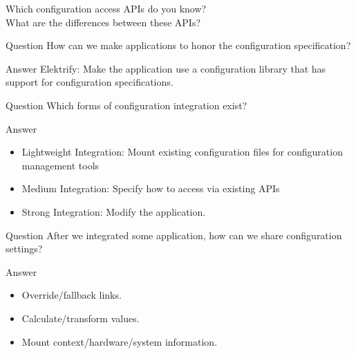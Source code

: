 \begin{frame}
	\begin{task}
	Which configuration access APIs do you know? \\
	What are the differences between these APIs?
	\end{task}
\end{frame}

\begin{frame}
	\begin{alertblock}{Question}
	How can we make applications to honor the configuration specification?
	\end{alertblock}

	\pause
	\begin{exampleblock}{Answer}
	Elektrify: Make the application use a configuration library that has support for configuration specifications.
	\end{exampleblock}
\end{frame}

\begin{frame}
	\begin{alertblock}{Question}
	Which forms of configuration integration exist?
	\end{alertblock}

	\pause
	\begin{exampleblock}{Answer}
	\begin{itemize}
	\item Lightweight Integration: Mount existing configuration files for configuration management tools
	\item Medium Integration: Specify how to access via existing APIs
	\item Strong Integration: Modify the application.
	\end{itemize}
	\end{exampleblock}
\end{frame}

\begin{frame}
	\begin{alertblock}{Question}
	After we integrated some application, how can we share configuration settings?
	\end{alertblock}

	\pause
	\begin{exampleblock}{Answer}
	\begin{itemize}
	\item Override/fallback links.
	\item Calculate/transform values.
	\item Mount context/hardware/system information.
	\end{itemize}
	\end{exampleblock}
\end{frame}


